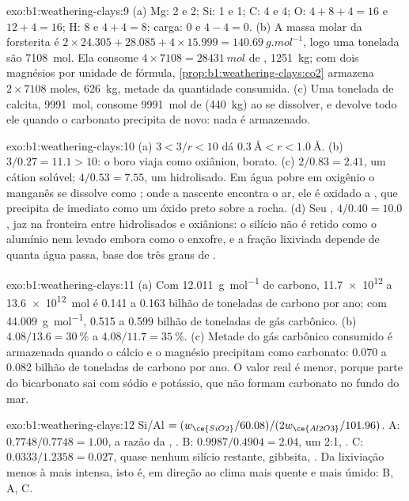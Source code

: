 \begin{solution}{exo:b1:weathering-clays:9}
(a) Mg: 2 e 2; Si: 1 e 1; C: 4 e 4; O: $4 + 8 + 4 = 16$ e $12 + 4 =
16$; H: 8 e $4 + 4 = 8$; carga: 0 e $4 - 4 = 0$. (b) A massa molar da forsterita é $2\times24.305 + 28.085 + 4\times15.999 =
\qty{140.69}{g.mol^{-1}}$, logo uma tonelada são \qty{7108}{mol}. Ela consome $4\times7108 = \qty{28431}{mol}$ de , \qty{1251}{kg}; com dois magnésios por unidade de fórmula, \cref{prop:b1:weathering-clays:co2} armazena $2\times7108$ moles, \qty{626}{kg}, metade da quantidade consumida. (c) Uma tonelada de calcita, \qty{9991}{mol}, consome \qty{9991}{mol} de  (\qty{440}{kg}) ao se dissolver, e devolve todo ele quando o carbonato precipita de novo: nada é armazenado.
\end{solution}

\begin{solution}{exo:b1:weathering-clays:10}
(a) $3 < 3/r < 10$ dá $\qty{0.3}{\angstrom} < r < \qty{1.0}{\angstrom}$. (b) $3/0.27 = 11.1 > 10$: o boro viaja como oxiânion, borato. (c) $2/0.83 =
2.41$, um cátion solúvel; $4/0.53 = 7.55$, um hidrolisado. Em água pobre em oxigênio o manganês se dissolve como ; onde a nascente encontra o ar, ele é oxidado a , que precipita de imediato como um óxido preto sobre a rocha. (d) Seu , $4/0.40 = 10.0$, jaz na fronteira entre hidrolisados e oxiânions: o silício não é retido como o alumínio nem levado embora como o enxofre, e a fração lixiviada depende de quanta água passa, base dos três graus de .
\end{solution}

\begin{solution}{exo:b1:weathering-clays:11}
(a) Com \qty{12.011}{g.mol^{-1}} de carbono, \num{11.7e12} a
\qty{13.6e12}{mol} é 0.141 a 0.163 bilhão de toneladas de carbono por ano; com \qty{44.009}{g.mol^{-1}}, 0.515 a 0.599 bilhão de toneladas de gás carbônico. (b) $4.08/13.6 = \qty{30}{\percent}$ a $4.08/11.7 = \qty{35}{\percent}$.
(c) Metade do gás carbônico consumido é armazenada quando o cálcio e o magnésio precipitam como carbonato: 0.070 a 0.082 bilhão de toneladas de carbono por ano. O valor real é menor, porque parte do bicarbonato sai com sódio e potássio, que não formam carbonato no fundo do mar.
\end{solution}

\begin{solution}{exo:b1:weathering-clays:12}
Si/Al $= (w_{\ce{SiO2}}/60.08)/(2w_{\ce{Al2O3}}/101.96)$. A: $0.7748/0.7748 =
1.00$, a razão da , . B: $0.9987/0.4904 = 2.04$, um  2:1, . C: $0.0333/1.2358 = 0.027$, quase nenhum silício restante, gibbsita, . Da lixiviação menos à mais intensa, isto é, em direção ao clima mais quente e mais úmido: B, A, C.
\end{solution}

